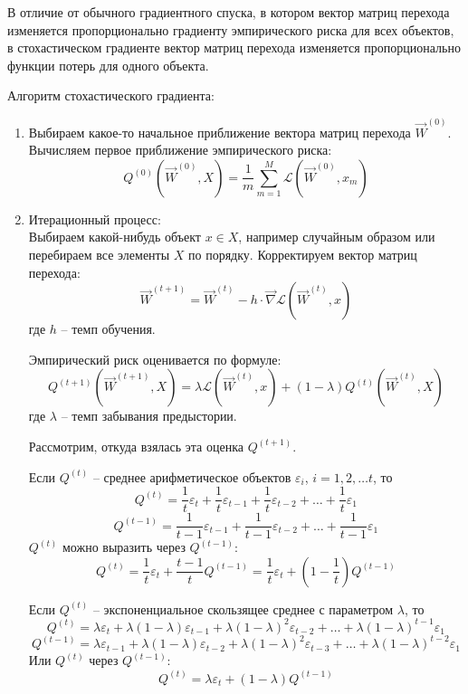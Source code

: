 В отличие от обычного градиентного спуска, в котором вектор матриц перехода изменяется пропорционально градиенту эмпирического риска для всех объектов, в стохастическом градиенте вектор матриц перехода изменяется пропорционально функции потерь для одного объекта.

Алгоритм стохастического градиента:

\begin{enumerate}
	\item Выбираем какое-то начальное приближение вектора матриц перехода $\overrightarrow{W}^{(0)}$. Вычисляем первое приближение эмпирического риска:
	$$
	Q^{(0)}(\overrightarrow{W}^{(0)}, X) = \frac{1}{m} \sum\limits_{m = 1}^{M} \mathcal{L} (\overrightarrow{W}^{(0)}, x_m)
	$$
	
	\item Итерационный процесс: \\
 	Выбираем какой-нибудь объект $x \in X$, например случайным образом или перебираем все элементы $X$ по порядку. Корректируем вектор матриц перехода:
	$$
	\overrightarrow{W}^{(t+1)} = \overrightarrow{W}^{(t)} - h \cdot \overrightarrow{\nabla} \mathcal{L} (\overrightarrow{W}^{(t)}, x)
	$$
	где $h$ -- темп обучения.
	
	Эмпирический риск оценивается по формуле:
	$$
	Q^{(t+1)}(\overrightarrow{W}^{(t+1)}, X) = \lambda \mathcal{L} (\overrightarrow{W}^{(t)}, x) + (1-\lambda)  Q^{(t)}(\overrightarrow{W}^{(t)}, X)
	$$
	где $\lambda$ -- темп забывания предыстории.
	
	Рассмотрим, откуда взялась эта оценка $Q^{(t+1)}$.
	
	Если $Q^{(t)}$ -- среднее арифметическое объектов $\varepsilon_i$, $i = 1, 2, \dots t$, то
	$$
	Q^{(t)} = \frac{1}{t} \varepsilon_t + \frac{1}{t} \varepsilon_{t-1} + \frac{1}{t} \varepsilon_{t-2} + \dots + \frac{1}{t} \varepsilon_{1}
	$$
	$$
	Q^{(t - 1)} = \frac{1}{t-1} \varepsilon_{t-1} + \frac{1}{t-1} \varepsilon_{t-2} + \dots + \frac{1}{t-1} \varepsilon_{1}
	$$
	$Q^{(t)}$ можно выразить через $Q^{(t-1)}$:
	$$
	Q^{(t)} = \frac{1}{t} \varepsilon_t + \frac{t-1}{t} Q^{(t-1)} = \frac{1}{t} \varepsilon_t + (1 - \frac{1}{t}) Q^{(t-1)}
	$$
	
	Если $Q^{(t)}$ -- экспоненциальное скользящее среднее с параметром $\lambda$, то
	$$
	Q^{(t)} = \lambda \varepsilon_t + \lambda (1-\lambda) \varepsilon_{t-1} + \lambda (1-\lambda)^2 \varepsilon_{t-2} + \dots + \lambda (1-\lambda)^{t-1} \varepsilon_{1}
	$$
	$$
	Q^{(t - 1)} = \lambda \varepsilon_{t-1} + \lambda (1-\lambda) \varepsilon_{t-2} + \lambda (1-\lambda)^2 \varepsilon_{t-3} + \dots + \lambda (1-\lambda)^{t-2} \varepsilon_{1}
	$$
	Или $Q^{(t)}$ через $Q^{(t-1)}$:
	$$
	Q^{(t)} = \lambda \varepsilon_t + (1 - \lambda) Q^{(t - 1)}
	$$
	

\end{enumerate}
